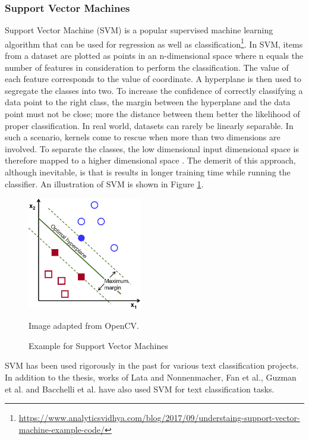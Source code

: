 \documentclass[a4paper,12pt,twoside]{report}
\begin{document}
\subsubsection{Support Vector Machines}
Support Vector Machine (SVM) is a popular supervised machine learning algorithm that can be used for regression as well as classification\footnote{\url{https://www.analyticsvidhya.com/blog/2017/09/understaing-support-vector-machine-example-code/}}. In SVM, items from a dataset are plotted as points in an n-dimensional space where n equals the number of features in consideration to perform the classification. The value of each feature corresponds to the value of coordinate. A hyperplane is then used to segregate the classes into two. To increase the confidence of correctly classifying a data point to the right class, the margin between the hyperplane and the data point must not be close; more the distance between them better the likelihood of proper classification\cite{Joachims1998a}.  
\newline \newline
In real world, datasets can rarely be linearly separable. In such a scenario, kernels come to rescue when more than two dimensions are involved. To separate the classes, the low dimensional input dimensional space is therefore mapped to a higher dimensional space \cite{Tong2001}. The demerit of this approach, although inevitable, is that is results in longer training time while running the classifier. An illustration of SVM is shown in Figure \ref{fig:svm}. 
\begin{figure}[h] %
    \centering
    \includegraphics[width=5cm]{optimal-hyperplane}
    \caption{Example for Support Vector Machines}
    \small Image adapted from OpenCV\footnotemark.
    \label{fig:svm}
\end{figure}
\newline \newline
SVM has been used rigorously in the past for various text classification projects. In addition to the thesis, works of Lata \cite{Lata2016} and Nonnenmacher\cite{Nonnenmacher2017}, Fan et al.\cite{Fan2017}, Guzman et al.\cite{Guzman2016} and Bacchelli et al.\cite{Bacchelli2012} have also used SVM for text classification tasks. 
\end{document}
